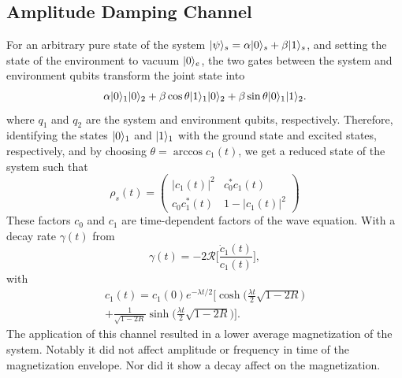 \documentclass[12pt, twocolumn]{article}
\newcommand*{\eu}{e}
\DeclarePairedDelimiter{\ket}{\lvert}{\rangle}
\begin{document}
  \subsection{Amplitude Damping Channel}
  For an arbitrary pure state of the system \( \ket{\psi}_{s} = \alpha \ket{0}_{s} + \beta \ket{1}_{s} \), and setting the state of the environment to vacuum \( \ket{0}_{e} \), the two gates between the system and environment qubits transform the joint state into
  \begin{equation}
    \alpha \ket{0}_{1} \ket{0}_{2} + \beta \cos \theta \ket{1}_{1} \ket{0}_{2}
    + \beta \sin \theta \ket{0}_{1} \ket{1}_{2}.
  \end{equation}
  where \( q_{1} \) and \( q_{2} \) are the system and environment qubits, respectively. Therefore, identifying the states \( \ket{0}_{1} \) and \( \ket{1}_{1} \) with the ground state and excited states, respectively, and by choosing \( \theta = \arccos c_{1}(t) \), we get a reduced state of the system such that
  \begin{equation}
    \rho_{s}(t)
      = \begin{pmatrix}
          \lvert c_{1}(t) \rvert^{2} & c_{0}^{*} c_{1}(t)             \\
          c_{0} c_{1}^{*}(t)         & 1 - \lvert c_{1}(t) \rvert^{2}
        \end{pmatrix}
  \end{equation}
  These factors \( c_{0} \) and \( c_{1} \) are time-dependent factors of the wave equation. With a decay rate \( \gamma(t) \) from
  \begin{equation}
    \gamma(t) = -2 \mathcal{R} \biggl[ \frac{\dot{c}_{1}(t)}{c_{1}(t)} \biggr],
  \end{equation}
  with
  \begin{equation}
  \begin{split}
          c_{1}(t)
      = c_{1}(0) \eu^{-\lambda t / 2}
        \biggl[
          \cosh \biggl( \frac{\lambda t}{2} \sqrt{1 - 2 R} \biggr) \\
          + \frac{1}{\sqrt{1 - 2 R}}
            \sinh \biggl( \frac{\lambda t}{2} \sqrt{1 - 2 R} \biggr)
        \biggr].
  \end{split}
  \end{equation}
  The application of this channel resulted in a lower average magnetization of the system. Notably it did not affect amplitude or frequency in time of the magnetization envelope. Nor did it show a decay affect on the magnetization.
\end{document}
